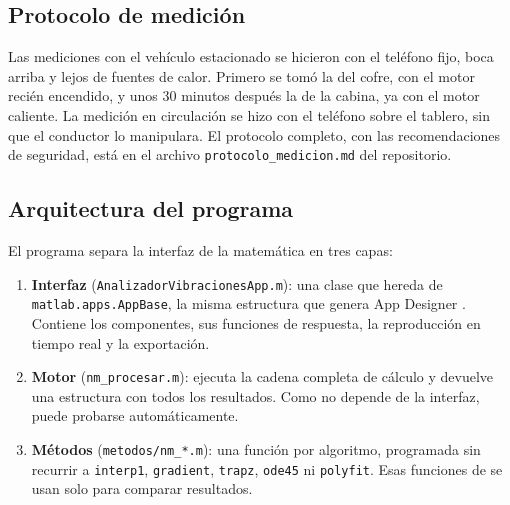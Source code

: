 \subsection{Protocolo de medición}

Las mediciones con el vehículo estacionado se hicieron con el teléfono fijo, boca arriba y lejos de fuentes de calor. Primero se tomó la del cofre, con el motor recién encendido, y unos 30 minutos después la de la cabina, ya con el motor caliente. La medición en circulación se hizo con el teléfono sobre el tablero, sin que el conductor lo manipulara. El protocolo completo, con las recomendaciones de seguridad, está en el archivo \texttt{protocolo\_medicion.md} del repositorio.

\subsection{Arquitectura del programa}

El programa separa la interfaz de la matemática en tres capas:
\begin{enumerate}
  \item \textbf{Interfaz} (\texttt{AnalizadorVibracionesApp.m}): una clase que hereda de \texttt{matlab.apps.AppBase}, la misma estructura que genera App Designer \parencite{mathworks_onramp}. Contiene los componentes, sus funciones de respuesta, la reproducción en tiempo real y la exportación.
  \item \textbf{Motor} (\texttt{nm\_procesar.m}): ejecuta la cadena completa de cálculo y devuelve una estructura con todos los resultados. Como no depende de la interfaz, puede probarse automáticamente.
  \item \textbf{Métodos} (\texttt{metodos/nm\_*.m}): una función por algoritmo, programada sin recurrir a \texttt{interp1}, \texttt{gradient}, \texttt{trapz}, \texttt{ode45} ni \texttt{polyfit}. Esas funciones de \matlab{} se usan solo para comparar resultados.
\end{enumerate}

